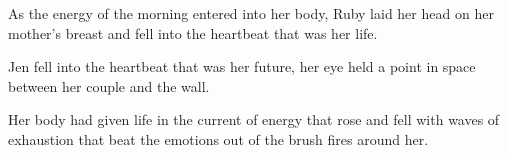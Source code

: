 

As the energy of the morning entered into her body, Ruby laid her head
on her mother's breast and fell into the heartbeat that was her life.

Jen fell into the heartbeat that was her future, her eye held a point
in space between her couple and the wall.

Her body had given life in the current of energy that rose and fell
with waves of exhaustion that beat the emotions out of the brush fires
around her.

\bye
